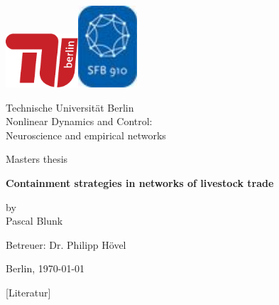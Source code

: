 \documentclass[12pt,a4paper,BCOR=15mm]{scrbook}
\makeatletter
\renewcommand\cleardoublepage{ 
\clearpage \if@twoside \ifodd \c@page \else \hbox {}\thispagestyle{empty}\newpage 
\if@twocolumn \hbox {}\thispagestyle{empty}\newpage  \fi \fi \fi 
}
\makeatother
\begin{document}
\begin{titlepage}
\centerline{\includegraphics[width=2.7cm]{tu.pdf}\hfill\includegraphics[width=2.2cm]{sfb910.jpg}}
\vspace*{1cm}
\begin{center}
\large
Technische Universität Berlin\\
Nonlinear Dynamics and Control: \\ Neuroscience and empirical networks
\end{center}
\vspace*{1cm}
\centerline{Masters thesis}
\vspace*{1cm}
\begin{center}
\LARGE{\textbf{Containment strategies in networks of livestock trade}}
\end{center}
\medskip
\begin{center}
by\\
Pascal Blunk
\end{center}
\vspace*{2cm}
\centerline{Betreuer: Dr. Philipp Hövel}
\vspace*{5cm}
\centerline{Berlin, \today}
\thispagestyle{empty}
\cleardoublepage
\end{titlepage}

\tableofcontents


\cleardoublepage
\listoffigures
\cleardoublepage





 
[Literatur]
\end{document}
